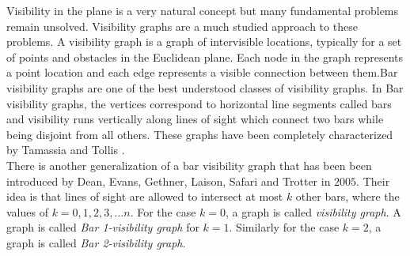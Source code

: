 Visibility in the plane is a very natural concept but many fundamental problems remain unsolved. Visibility graphs are a much studied approach to these problems. A visibility graph is a graph of intervisible locations, typically for a set of points and obstacles in the Euclidean plane. Each node in the graph represents a point location and each edge represents a visible connection between them.Bar visibility graphs are one of the best understood classes of visibility graphs. In Bar visibility graphs, the vertices correspond to horizontal line segments called bars and visibility runs vertically along lines of sight which connect two bars while being disjoint from all others. These graphs have been completely characterized by Tamassia and Tollis \cite{R}.
\\


There is another generalization of a bar visibility graph that has been been introduced by Dean, Evans, Gethner, Laison, Safari and Trotter \cite{M} in $2005$. Their idea is that lines of sight are allowed to intersect at most $k$ other bars, where the values of $k = 0,1,2,3,\ldots n$. For the case $k = 0$, a graph is called \emph{visibility graph}. A graph is called \emph{Bar 1-visibility graph} for $k = 1$. Similarly for the case $k = 2$, a graph is called \emph{Bar 2-visibility graph}.
\\


